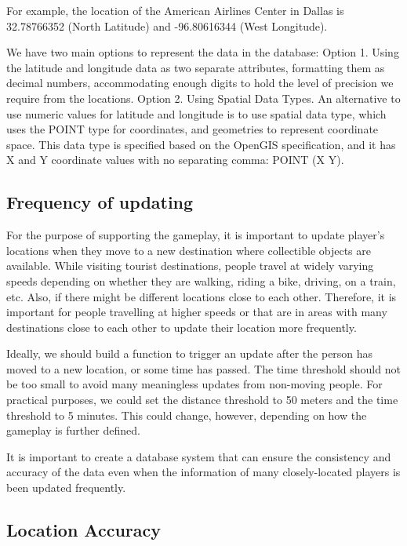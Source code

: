 \documentclass[conference]{IEEEtran}
\begin{document}
For example, the location of the American Airlines Center in Dallas is 32.78766352 (North Latitude) and  -96.80616344 (West Longitude).

We have two main options to represent the data in the database:
Option 1. Using the latitude and longitude data as two separate attributes, formatting them as decimal numbers, accommodating enough digits to hold the level of precision we require from the locations. 
Option 2. Using Spatial Data Types. An alternative to use numeric values for latitude and longitude is to use spatial data type, which uses the POINT type for coordinates, and geometries to represent coordinate space. This data type is specified based on the OpenGIS specification, and it has X and Y coordinate values with no separating comma: POINT (X Y). 

\subsection{Frequency of updating} 

For the purpose of supporting the gameplay, it is important to update player’s locations when they move to a new destination where collectible objects are available. While visiting tourist destinations, people travel at widely varying speeds depending on whether they are walking, riding a bike, driving, on a train, etc. Also, if there might be different locations close to each other. Therefore, it is important for people travelling at higher speeds or that are in areas with many destinations close to each other to update their location more frequently. 

Ideally, we should build a function to trigger an update after the person has moved to a new location, or some time has passed. The time threshold should not be too small to avoid many meaningless updates from non-moving people. For practical purposes, we could set the distance threshold to 50 meters and the time threshold to 5 minutes. This could change, however, depending on how the gameplay is further defined.  

It is important to create a database system that can ensure the consistency and accuracy of the data even when the information of many closely-located players is been updated frequently. 

\subsection{Location Accuracy} 
\end{document}
